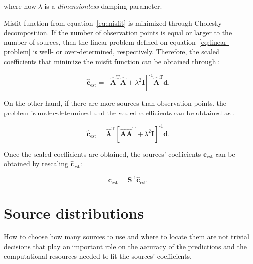 \documentclass[twocolumn]{article}
\newcommand{\inv}{^{\text{-}1}}
\begin{document}
\noindent where now $\lambda$ is a \emph{dimensionless} damping parameter.

Misfit function from equation~\ref{eq:misfit} is minimized through Cholesky
decomposition.
If the number of observation points is equal or larger to the number of
sources, then the linear problem defined on equation~\ref{eq:linear-problem} is
well- or over-determined, respectively. Therefore, the scaled coefficients that
minimize the misfit function can be obtained through \citep{menke1989}:

\begin{equation}
    \hat{\mathbf{c}}_\text{est} =
        \left[
            \hat{\mathbf{A}}^\text{T} \hat{\mathbf{A}}
            + \lambda^2 \mathbf{I}
        \right]\inv
        \hat{\mathbf{A}}^\text{T}
        \mathbf{d}.
\end{equation}

On the other hand, if there are more sources than observation points, the
problem is under-determined and the scaled coefficients can be obtained as
\citep{menke1989}:

\begin{equation}
    \hat{\mathbf{c}}_\text{est} =
    \hat{\mathbf{A}}^\text{T}
        \left[
            \hat{\mathbf{A}} \hat{\mathbf{A}}^\text{T}
            + \lambda^2 \mathbf{I}
        \right]\inv
        \mathbf{d}.
\end{equation}


Once the scaled coefficients are obtained, the sources' coefficients
$\mathbf{c}_\text{est}$ can be obtained by rescaling
$\hat{\mathbf{c}}_\text{est}$:

\begin{equation}
    \mathbf{c}_\text{est} = \mathbf{S}\inv \hat{\mathbf{c}}_\text{est}.
\end{equation}




\section{Source distributions}


How to choose how many sources to use and where to locate them are not
trivial decisions that play an important role on the accuracy of the
predictions and the computational resources needed to fit the sources'
coefficients.
\end{document}
